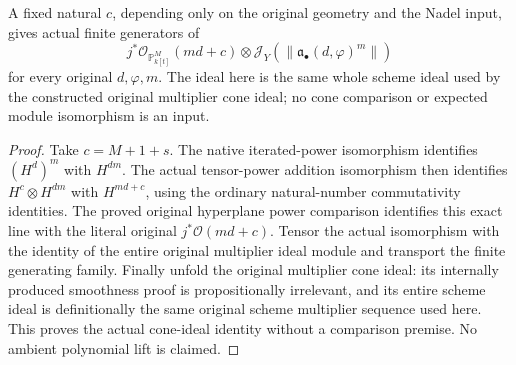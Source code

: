 \begin{theorem}
\label{thm:c0n-original-asymptotic-literal-twist-generators}
\leanok
{}
A fixed natural $c$, depending only on the original geometry and the Nadel
input, gives actual finite generators of
\[
 j^*\mathcal O_{\mathbb P^M_{k[t]}}(md+c)\otimes
       \mathcal J_Y(\|\mathfrak a_\bullet(d,\varphi)^m\|)
\]
for every original $d,\varphi,m$. The ideal here is the same whole scheme
ideal used by the constructed original multiplier cone ideal; no cone
comparison or expected module isomorphism is an input.
\end{theorem}
\begin{proof}
Take $c=M+1+s$. The native iterated-power isomorphism identifies
$(H^d)^m$ with $H^{dm}$. The actual tensor-power addition isomorphism
then identifies $H^c\otimes H^{dm}$ with $H^{md+c}$, using the ordinary
natural-number commutativity identities. The proved original hyperplane
power comparison identifies this exact line with the literal original
$j^*\mathcal O(md+c)$. Tensor the actual isomorphism with the identity of
the entire original multiplier ideal module and transport the finite
generating family. Finally unfold the original multiplier cone ideal:
its internally produced smoothness proof is propositionally irrelevant,
and its entire scheme ideal is definitionally the same original scheme
multiplier sequence used here. This proves the actual cone-ideal identity
without a comparison premise. No ambient polynomial lift is claimed.
\end{proof}
